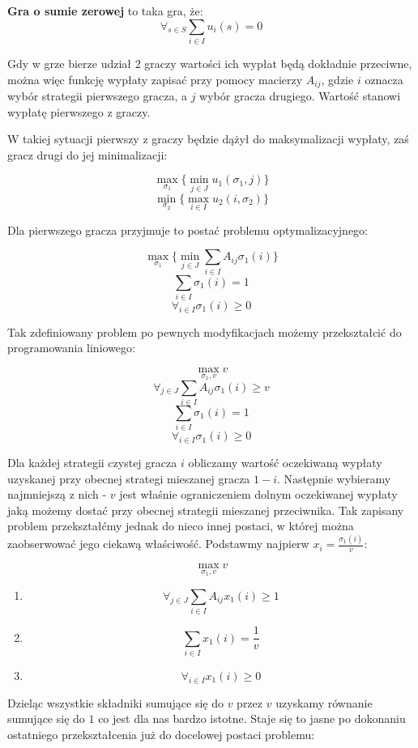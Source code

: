 \documentclass[polish]{standalone}
\begin{document}
\begin{definition}
\textbf{Gra o sumie zerowej} to taka gra, że:
$$\forall_{s \in S} \sum_{i \in I} u_i(s) = 0$$
\end{definition}

Gdy w grze bierze udział 2 graczy wartości ich wypłat będą dokładnie przeciwne, można więc funkcję wypłaty zapisać przy
pomocy macierzy $A_{ij}$, gdzie $i$ oznacza wybór strategii pierwszego gracza, a $j$ wybór gracza drugiego. Wartość
stanowi wypłatę pierwszego z graczy.

W takiej sytuacji pierwszy z graczy będzie dążył do maksymalizacji wypłaty, zaś gracz drugi do jej minimalizacji:

$$\max_{\sigma_1} \{ \min_{j \in J} u_1(\sigma_1, j) \}$$
$$\min_{\sigma_2} \{ \max_{i \in I} u_2(i, \sigma_2) \}$$

Dla pierwszego gracza przyjmuje to postać problemu optymalizacyjnego:

$$\max_{\sigma_1} \{ \min_{j \in J} \sum_{i \in I} A_{ij} \sigma_1(i) \}$$
$$\sum_{i \in I} \sigma_1(i) = 1$$
$$\forall_{i \in I} \sigma_1(i) \geq 0$$

Tak zdefiniowany problem po pewnych modyfikacjach możemy przekształcić do programowania liniowego:

$$\max_{\sigma_1,v} v$$
$$\forall_{j \in J} \sum_{i \in I} A_{ij} \sigma_1(i) \geq v$$
$$\sum_{i \in I} \sigma_1(i) = 1$$
$$\forall_{i \in I} \sigma_1(i) \geq 0$$

Dla każdej strategii czystej gracza $i$ obliczamy wartość oczekiwaną wypłaty uzyskanej przy obecnej strategi mieszanej
gracza $1-i$. Następnie wybieramy najmniejszą z nich - $v$ jest właśnie ograniczeniem dolnym oczekiwanej wypłaty jaką
możemy dostać przy obecnej strategii mieszanej przeciwnika. Tak zapisany problem przekształćmy jednak do nieco innej postaci, w której można zaobserwować jego ciekawą właściwość. Podstawmy najpierw $x_i = \frac{\sigma_1(i)}{v}$:

$$\max_{\sigma_1,v} v$$
\begin{enumerate}
\item $$\forall_{j \in J} \sum_{i \in I} A_{ij} x_1(i) \geq 1$$
\item $$\sum_{i \in I} x_1(i) = \frac{1}{v}$$
\item $$\forall_{i \in I} x_1(i) \geq 0$$
\end{enumerate}

Dzieląc wszystkie składniki sumujące się do $v$ przez $v$ uzyskamy równanie sumujące się do $1$ co jest dla nas bardzo
istotne. Staje się to jasne po dokonaniu ostatniego przekształcenia już do docelowej postaci problemu:
\end{document}
